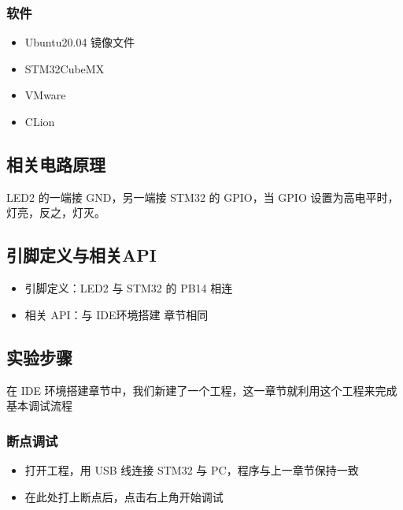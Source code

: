 \documentclass[a4paper,12pt,english]{sphinxmanual}
\begin{document}
\subsubsection{软件}
\label{\detokenize{exp-stm32/debug-flow:id5}}\begin{itemize}
\item {} 
\sphinxAtStartPar
Ubuntu20.04 镜像文件

\item {} 
\sphinxAtStartPar
STM32CubeMX

\item {} 
\sphinxAtStartPar
VMware

\item {} 
\sphinxAtStartPar
CLion

\end{itemize}


\subsection{相关电路原理}
\label{\detokenize{exp-stm32/debug-flow:id6}}
\sphinxAtStartPar
LED2 的一端接 GND，另一端接 STM32 的 GPIO，当 GPIO 设置为高电平时，灯亮，反之，灯灭。

\sphinxAtStartPar
{}

\sphinxAtStartPar
{}


\subsection{引脚定义与相关API}
\label{\detokenize{exp-stm32/debug-flow:api}}\begin{itemize}
\item {} 
\sphinxAtStartPar
引脚定义：LED2 与 STM32 的 PB14 相连

\item {} 
\sphinxAtStartPar
相关 API：与 IDE环境搭建 章节相同

\end{itemize}


\subsection{实验步骤}
\label{\detokenize{exp-stm32/debug-flow:id7}}
\sphinxAtStartPar
在 IDE 环境搭建章节中，我们新建了一个工程，这一章节就利用这个工程来完成基本调试流程


\subsubsection{断点调试}
\label{\detokenize{exp-stm32/debug-flow:id8}}\begin{itemize}
\item {} 
\sphinxAtStartPar
打开工程，用 USB 线连接 STM32 与 PC，程序与上一章节保持一致

\item {} 
\sphinxAtStartPar
在此处打上断点后，点击右上角开始调试

\end{itemize}
\end{document}
